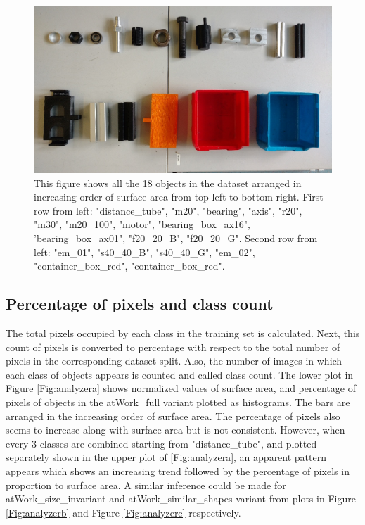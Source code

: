 		\begin{figure}
		\centering
		\includegraphics[scale=0.3]{images/all_objects}
		\caption{This figure shows all the 18 objects in the dataset arranged in increasing order of surface area from top left to bottom right. First row from left: "distance\_tube", "m20", "bearing", "axis", "r20", "m30", "m20\_100", "motor", "bearing\_box\_ax16", 'bearing\_box\_ax01", "f20\_20\_B", "f20\_20\_G". Second row from left: "em\_01", "s40\_40\_B", "s40\_40\_G", "em\_02", "container\_box\_red", "container\_box\_red".}
		\label{Fig:allobjects}
	\end{figure}
	
	\subsection{Percentage of pixels and class count}
		
		The total pixels occupied by each class in the training set is calculated. Next, this count of pixels is converted to percentage with respect to the total number of pixels in the corresponding dataset split. Also, the number of images in which each class of objects appears is counted and called class count. The lower plot in Figure \ref{Fig:analyzera} shows normalized values of surface area, and percentage of pixels of objects in the atWork\_full variant plotted as histograms. The bars are arranged in the increasing order of surface area. The percentage of pixels also seems to increase along with surface area but is not consistent. However, when every 3 classes are combined starting from "distance\_tube", and plotted separately shown in the upper plot of \ref{Fig:analyzera}, an apparent pattern appears which shows an increasing trend followed by the percentage of pixels in proportion to surface area. A similar inference could be made for atWork\_size\_invariant and atWork\_similar\_shapes variant from plots in Figure \ref{Fig:analyzerb} and Figure \ref{Fig:analyzerc} respectively.
		
